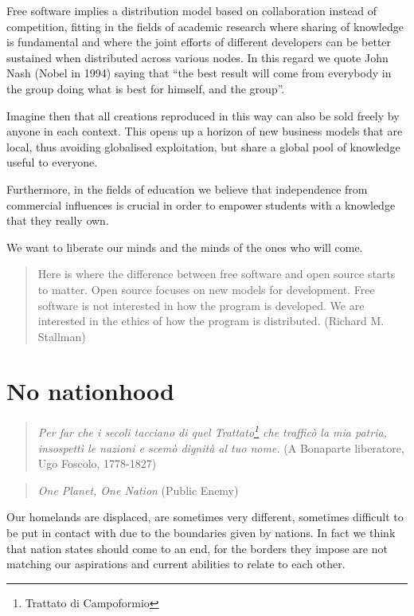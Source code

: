 Free software implies a distribution model based on collaboration instead of
competition, f\hbox{}itting in the f\hbox{}ields of academic research where
sharing of knowledge is fundamental and where the joint ef\hbox{}forts of
dif\hbox{}ferent developers can be better sustained when distributed across
various nodes. In this regard we quote John Nash (Nobel in 1994) saying that
``the best result will come from everybody in the group doing what is best for
himself, and the group''.

Imagine then that all creations reproduced in this way can also be sold freely
by anyone in each context. This opens up a horizon of new business models that
are local, thus avoiding globalised exploitation, but share a global pool of
knowledge useful to everyone.

Furthermore, in the f\hbox{}ields of education we believe that independence from
commercial inf\hbox{}luences is crucial in order to empower students with a
knowledge that they really own.

We want to liberate our minds and the minds of the ones who will come.

\begin{quote}
Here is where the dif\hbox{}ference between free software and open source starts
to matter. Open source focuses on new models for development. Free software is
not interested in how the program is developed. We are interested in the ethics
of how the program is distributed. (Richard M. Stallman)
\end{quote}


\section{No nationhood}
\label{s:weaver_birds:nationhood}

\begin{quote}
\textit{Per far che i secoli tacciano di quel Trattato\footnote{Trattato di
Campoformio} che traf\hbox{}f\hbox{}icò la mia patria, insospettì le nazioni e
scemò dignità al tuo nome.} (A Bonaparte liberatore, Ugo Foscolo, 1778-1827)
\end{quote}

\begin{quote}
\textit{One Planet, One Nation} (Public Enemy)
\end{quote}

Our homelands are displaced, are sometimes very dif\hbox{}ferent, sometimes
dif\hbox{}f\hbox{}icult to be put in contact with due to the boundaries given by
nations. In fact we think that nation states should come to an end, for the
borders they impose are not matching our aspirations and current abilities to
relate to each other.

